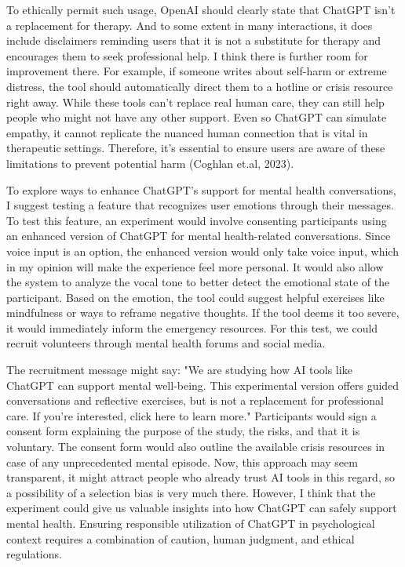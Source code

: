 \documentclass[
	letterpaper, %
]{jdf}
\begin{document}
To ethically permit such usage, OpenAI should clearly state that ChatGPT isn’t a replacement for therapy. And to some extent in many interactions, it does include disclaimers reminding users that it is not a substitute for therapy and encourages them to seek professional help. I think there is further room for improvement there. For example, if someone writes about self-harm or extreme distress, the tool should automatically direct them to a hotline or crisis resource right away. While these tools can’t replace real human care, they can still help people who might not have any other support. Even so ChatGPT can simulate empathy, it cannot replicate the nuanced human connection that is vital in therapeutic settings. Therefore, it's essential to ensure users are aware of these limitations to prevent potential harm (Coghlan et.al, 2023). 



To explore ways to enhance ChatGPT's support for mental health conversations, I suggest testing a feature that recognizes user emotions through their messages. To test this feature, an experiment would involve consenting participants using an enhanced version of ChatGPT for mental health-related conversations. Since voice input is an option, the enhanced version would only take voice input, which in my opinion will make the experience feel more personal. It would also allow the system to analyze the vocal tone to better detect the emotional state of the participant. Based on the emotion, the tool could suggest helpful exercises like mindfulness or ways to reframe negative thoughts. If the tool deems it too severe, it would immediately inform the emergency resources. For this test, we could recruit volunteers through mental health forums and social media.

The recruitment message might say: "We are studying how AI tools like ChatGPT can support mental well-being. This experimental version offers guided conversations and reflective exercises, but is not a replacement for professional care. If you’re interested, click here to learn more." Participants would sign a consent form explaining the purpose of the study, the risks, and that it is voluntary. The consent form would also outline the available crisis resources in case of any unprecedented mental episode. Now, this approach may seem transparent, it might attract people who already trust AI tools in this regard, so a possibility of a selection bias is very much there. However, I think that the experiment could give us valuable insights into how ChatGPT can safely support mental health. Ensuring responsible utilization of ChatGPT in psychological context requires a combination of caution, human judgment, and ethical regulations.
\end{document}
